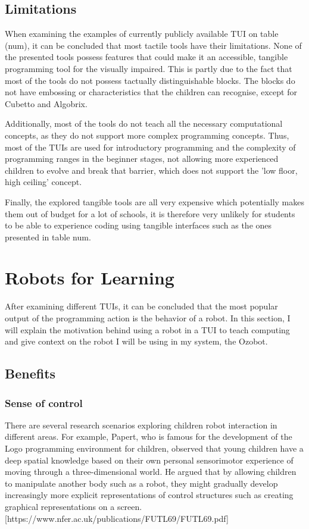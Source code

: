 \documentclass[oneside,%
                    author={Malak Hajji},
                    degree={BSc},
                    title={Designing An Accessible Computational Toolkit For Students},
                  subtitle={With Mixed Visual Abilities}]{dissertation}
\begin{document}
\subsection{Limitations}
When examining the examples of currently publicly available TUI on table (num), it can be concluded that most tactile tools have their limitations. None of the presented tools possess features that could make it an accessible, tangible programming tool for the visually impaired. This is partly due to the fact that most of the tools do not possess tactually distinguishable blocks. The blocks do not have embossing or characteristics that the children can recognise, except for Cubetto and Algobrix. 

Additionally, most of the tools do not teach all the necessary computational concepts, as they do not support more complex programming concepts. Thus, most of the TUIs are used for introductory programming and the complexity of programming ranges in the beginner stages, not allowing more experienced children to evolve and break that barrier, which does not support the 'low floor, high ceiling' concept. 

Finally, the explored tangible tools are all very expensive which potentially makes them out of budget for a lot of schools, it is therefore very unlikely for students to be able to experience coding using tangible interfaces such as the ones presented in table num.

\section{Robots for Learning}

After examining different TUIs, it can be concluded that the most popular output of the programming action is the behavior of a robot. In this section, I will explain the motivation behind using a robot in a TUI to teach computing and give context on the robot I will be using in my system, the Ozobot.

\subsection{Benefits}

\subsubsection{Sense of control}
There are several research scenarios exploring children robot interaction in different areas. For example, Papert, who is famous for the development of the Logo programming environment for children, observed that young children have a deep spatial knowledge based on their own personal sensorimotor experience of moving through a three-dimensional world. He argued that by allowing children to manipulate another body such as a robot, they might gradually develop increasingly more explicit representations of control structures such as creating graphical representations on a screen. [https://www.nfer.ac.uk/publications/FUTL69/FUTL69.pdf] 
\end{document}
